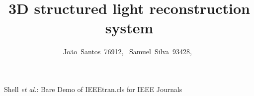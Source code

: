 \documentclass[journal]{IEEEtran}
\begin{document}
%
\title{3D structured light reconstruction system}
%
%
%

\author{João~Santos~76912,~
        Samuel~Silva~93428,~}%

% 
%



%
{Shell \MakeLowercase{\textit{et al.}}: Bare Demo of IEEEtran.cls for IEEE Journals}
% 
\end{document}
